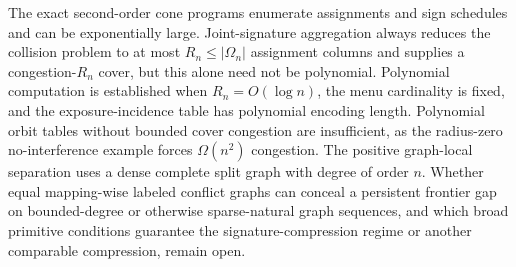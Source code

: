 The exact second-order cone programs enumerate assignments and sign schedules and can be exponentially large. Joint-signature aggregation always reduces the collision problem to at most \(R_n\le|\Omega_n|\) assignment columns and supplies a congestion-\(R_n\) cover, but this alone need not be polynomial. Polynomial computation is established when \(R_n=O(\log n)\), the menu cardinality is fixed, and the exposure-incidence table has polynomial encoding length. Polynomial orbit tables without bounded cover congestion are insufficient, as the radius-zero no-interference example forces \(\Omega(n^2)\) congestion. The positive graph-local separation uses a dense complete split graph with degree of order \(n\). Whether equal mapping-wise labeled conflict graphs can conceal a persistent frontier gap on bounded-degree or otherwise sparse-natural graph sequences, and which broad primitive conditions guarantee the signature-compression regime or another comparable compression, remain open.